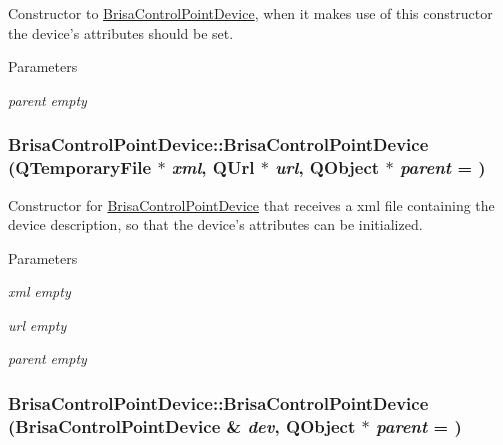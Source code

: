 Constructor to \hyperlink{classBrisaUpnp_1_1BrisaControlPointDevice}{BrisaControlPointDevice}, when it makes use of this constructor the device's attributes should be set. 
\begin{DoxyParams}{Parameters}
\item[{\em parent}]{\itshape empty\/} \end{DoxyParams}
\hypertarget{classBrisaUpnp_1_1BrisaControlPointDevice_a5001189cc91c6121878f8aeda7cfdeac}{
\subsubsection[{BrisaControlPointDevice}]{\setlength{\rightskip}{0pt plus 5cm}BrisaControlPointDevice::BrisaControlPointDevice (QTemporaryFile $\ast$ {\em xml}, \/  QUrl $\ast$ {\em url}, \/  QObject $\ast$ {\em parent} = {})}}
\label{classBrisaUpnp_1_1BrisaControlPointDevice_a5001189cc91c6121878f8aeda7cfdeac}


Constructor for \hyperlink{classBrisaUpnp_1_1BrisaControlPointDevice}{BrisaControlPointDevice} that receives a xml file containing the device description, so that the device's attributes can be initialized. 
\begin{DoxyParams}{Parameters}
\item[{\em xml}]{\itshape empty\/} \item[{\em url}]{\itshape empty\/} \item[{\em parent}]{\itshape empty\/} \end{DoxyParams}
\hypertarget{classBrisaUpnp_1_1BrisaControlPointDevice_ab5811ed1286b02af97d5d44033775c77}{
\subsubsection[{BrisaControlPointDevice}]{\setlength{\rightskip}{0pt plus 5cm}BrisaControlPointDevice::BrisaControlPointDevice ({\bf BrisaControlPointDevice} \& {\em dev}, \/  QObject $\ast$ {\em parent} = {})}}
\label{classBrisaUpnp_1_1BrisaControlPointDevice_ab5811ed1286b02af97d5d44033775c77}


